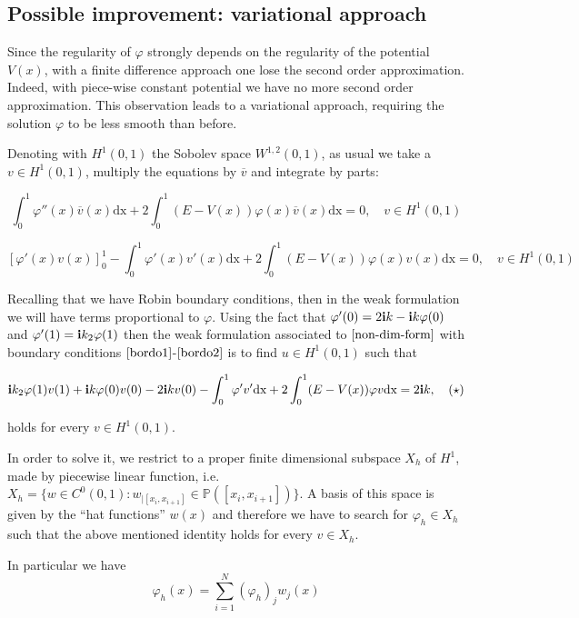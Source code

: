 \documentclass[12pt,a4paper,onecolumn]{article}
\theoremstyle{definition}
\theoremstyle{plain}
\newcommand{\var}{\varphi}
\begin{document}
\subsection{Possible improvement:  variational approach}


Since the regularity of $\var$ strongly depends on the regularity of the potential $V(x)$, with a finite difference approach one lose the second order approximation. Indeed, with piece-wise constant potential we have no more second order approximation. This observation leads to a variational approach, requiring the solution $\var$ to be less smooth than before. 

Denoting with $H^1(0,1)$ the Sobolev space $W^{1,2}(0,1)$, as usual we take a $v \in H^1(0,1)$, multiply the equations by $\overline{v}$ and integrate by parts:


\[
\int_{0}^{1} \var ''(x) \overline{v}(x)  \text{dx} + 2 \int_0^1 (E-V(x))\var (x) \overline{v}(x) \text{dx} =0, \quad v \in H^1(0,1)
\]



\[
[\var '(x) v(x)]_{0}^{1} - \int_{0}^{1} \var '(x) v'(x)  \text{dx}+ 2 \int_0^1 (E-V(x))\var (x) v(x) \text{dx} =0, \quad v \in H^1(0,1)
\]

Recalling that we have Robin boundary conditions, then in the weak formulation we will have terms proportional to $\var $. Using the fact that $\var'(0)=2 \bold{i} k - \bold{i} k \var(0)$ and $\var'(1)=\bold{i}k_2 \var(1)$ then the weak formulation associated to $\eqref{non-dim-form}$ with boundary conditions $\eqref{bordo1}$-$\eqref{bordo2}$ is to find $u \in H^1(0,1)$ such that


\[ 
\bold{i} k_2 \var(1)v(1) + \bold{i} k \var(0) v(0) -2 \bold{i}k v(0) - \int_0^1 \var' v' \text{dx} + 2 \int_0^1(E-V(x)) \var v \text{dx} = 2 \bold{i}k, 	\quad (\star)
\]

holds for every $v \in H^1(0,1)$.

In order to solve it, we restrict to a proper finite dimensional subspace $X_h$ of $H^1$, made by piecewise linear function, i.e. $X_h=\{ w \in C^{0}(0,1): w_{|[x_i,x_{i+1}]} \in \mathbb{P}([x_i,x_{i+1}]) \} $. A basis of this space is given by the ``hat functions'' $w(x)$ and therefore we have to search for $\var_h \in X_h$ such that the above mentioned identity holds for every $v \in X_h$.

In particular we have 
\begin{equation}
\label{eqn:fem}
\var_h(x)=\sum_{i=1}^{N} (\var_h)_j w_{j}(x)
\end{equation}
\end{document}
